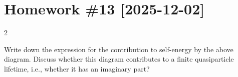 
\section*{Homework \#13 [2025-12-02]}

\begin{paracol}{2}
  \begin{problem}
    Write down the expression for the contribution to self-energy by the
    above diagram. Discuss whether this diagram contributes to a finite
    quasiparticle lifetime, i.e., whether it has an imaginary part?
  \end{problem}
  \switchcolumn \centering
\end{paracol}
\vspace{-12pt}
